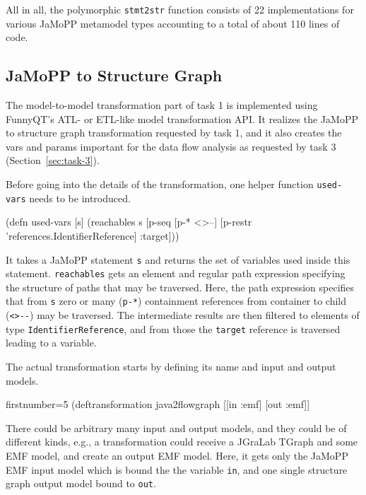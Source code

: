 \documentclass[11pt]{article}
\begin{document}
All in all, the polymorphic \verb|stmt2str| function consists of 22
implementations for various JaMoPP metamodel types accounting to a total of
about 110 lines of code.


\subsection{JaMoPP to Structure Graph}
\label{sec:jamopp-struct-graph}

The model-to-model transformation part of task 1 is implemented using FunnyQT's
ATL- or ETL-like model transformation API.  It realizes the JaMoPP to structure
graph transformation requested by task 1, and it also creates the vars and
params important for the data flow analysis as requested by task 3
(Section~\ref{sec:task-3}).

Before going into the details of the transformation, one helper function
\verb|used-vars| needs to be introduced.

\begin{clojurecode}
(defn used-vars [s]
  (reachables s [p-seq [p-* <>--]
                 [p-restr 'references.IdentifierReference]
                 :target]))
\end{clojurecode}

It takes a JaMoPP statement \verb|s| and returns the set of variables used
inside this statement.  \verb|reachables| gets an element and regular path
expression specifying the structure of paths that may be traversed.  Here, the
path expression specifies that from \verb|s| zero or many (\verb|p-*|)
containment references from container to child (\verb|<>--|) may be traversed.
The intermediate results are then filtered to elements of type
\verb|IdentifierReference|, and from those the \verb|target| reference is
traversed leading to a variable.

The actual transformation starts by defining its name and input and output
models.

\begin{clojurecode*}{firstnumber=5}
(deftransformation java2flowgraph [[in :emf] [out :emf]]
\end{clojurecode*}

There could be arbitrary many input and output models, and they could be of
different kinds, e.g., a transformation could receive a JGraLab TGraph and some
EMF model, and create an output EMF model.  Here, it gets only the JaMoPP EMF
input model which is bound the the variable \verb|in|, and one single structure
graph output model bound to \verb|out|.
\end{document}
